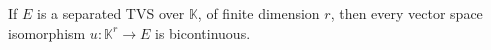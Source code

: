 If $E$ is a separated TVS over $\mathbb{K}$, of finite dimension $r$, then every vector space isomorphism $u: \mathbb{K}^r \rightarrow E$ is bicontinuous.
